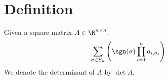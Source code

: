 
\section*{Definition}

Given a square matrix $A \in \R ^{n \times  n}$.
\[
\sum_{\sigma  \in S_n} \left( \sgn(\sigma ) \prod_{i = 1}^{n} a_{i,\sigma _{i}} \right)
\]
We denote the determinant of $A$ by $\det A$.

\blankpage
